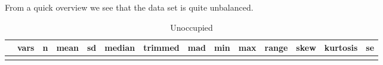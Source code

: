 \documentclass[
]{article}
\begin{document}
From a quick overview we see that the data set is quite unbalanced.

\begin{longtable}[]{@{}lrrrrrrrrrrrrr@{}}
\caption{Unoccupied}\tabularnewline
\toprule
\begin{minipage}[b]{0.08\columnwidth}\raggedright
\strut
\end{minipage} & \begin{minipage}[b]{0.03\columnwidth}\raggedleft
vars\strut
\end{minipage} & \begin{minipage}[b]{0.03\columnwidth}\raggedleft
n\strut
\end{minipage} & \begin{minipage}[b]{0.05\columnwidth}\raggedleft
mean\strut
\end{minipage} & \begin{minipage}[b]{0.05\columnwidth}\raggedleft
sd\strut
\end{minipage} & \begin{minipage}[b]{0.05\columnwidth}\raggedleft
median\strut
\end{minipage} & \begin{minipage}[b]{0.05\columnwidth}\raggedleft
trimmed\strut
\end{minipage} & \begin{minipage}[b]{0.05\columnwidth}\raggedleft
mad\strut
\end{minipage} & \begin{minipage}[b]{0.05\columnwidth}\raggedleft
min\strut
\end{minipage} & \begin{minipage}[b]{0.05\columnwidth}\raggedleft
max\strut
\end{minipage} & \begin{minipage}[b]{0.05\columnwidth}\raggedleft
range\strut
\end{minipage} & \begin{minipage}[b]{0.04\columnwidth}\raggedleft
skew\strut
\end{minipage} & \begin{minipage}[b]{0.05\columnwidth}\raggedleft
kurtosis\strut
\end{minipage} & \begin{minipage}[b]{0.03\columnwidth}\raggedleft
se\strut
\end{minipage}\tabularnewline
\midrule
\endfirsthead
\toprule
\begin{minipage}[b]{0.08\columnwidth}\raggedright
\strut
\end{minipage} & \begin{minipage}[b]{0.03\columnwidth}\raggedleft

\end{minipage}
\end{longtable}
\end{document}
